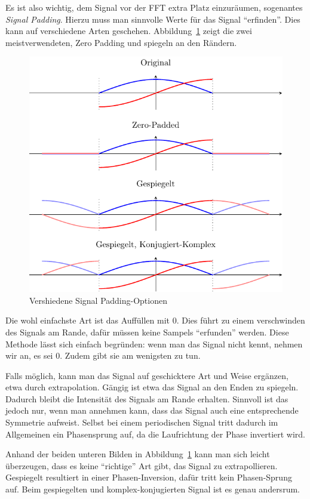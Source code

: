 Es ist also wichtig, dem Signal vor der FFT extra Platz einzuräumen, sogenantes \emph{Signal Padding}.
Hierzu muss man sinnvolle Werte für das Signal ``erfinden''.
Dies kann auf verschiedene Arten geschehen.
Abbildung~\ref{complex:padding} zeigt die zwei meistverwendeten, Zero Padding und spiegeln an den Rändern.
\begin{figure}
	\centering
	\includegraphics{papers/complex/images/signal_padding.pdf}
	\caption{Vershiedene Signal Padding-Optionen}
	\label{complex:padding}
\end{figure}

Die wohl einfachste Art ist das Auffüllen mit $0$.
Dies führt zu einem verschwinden des Signals am Rande, dafür müssen keine Sampels ``erfunden'' werden.
Diese Methode lässt sich einfach begründen: wenn man das Signal nicht kennt, nehmen wir an, es sei $0$.
Zudem gibt sie am wenigsten zu tun.

Falls möglich, kann man das Signal auf geschicktere Art und Weise ergänzen, etwa durch extrapolation.
Gängig ist etwa das Signal an den Enden zu spiegeln.
Dadurch bleibt die Intensität des Signals am Rande erhalten.
Sinnvoll ist das jedoch nur, wenn man annehmen kann, dass das Signal auch eine entsprechende Symmetrie aufweist.
Selbst bei einem periodischen Signal tritt dadurch im Allgemeinen ein Phasensprung auf, da die Laufrichtung der Phase invertiert wird.

Anhand der beiden unteren Bilden in Abbildung~\ref{complex:padding} kann man sich leicht überzeugen, dass es keine ``richtige'' Art gibt, das Signal zu extrapollieren.
Gespiegelt resultiert in einer Phasen-Inversion, dafür tritt kein Phasen-Sprung auf.
Beim gespiegelten und komplex-konjugierten Signal ist es genau andersrum.

